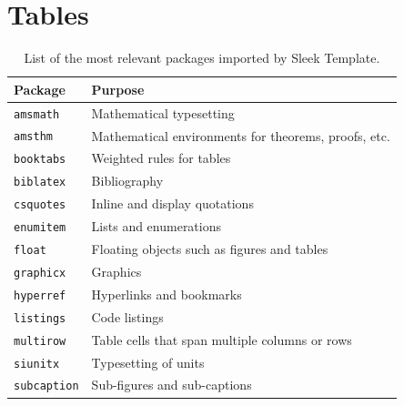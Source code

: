 \documentclass[a4paper, 12pt]{report}
\begin{document}
    \printbibliography

    \appendix

    \chapter{Tables} \label{chap:Tables}

    \begin{table}[h]
        \centering
        \begin{tabular}{ll}
            \toprule
            \textbf{Package} & \textbf{Purpose} \\
            \midrule
            \texttt{amsmath} & Mathematical typesetting \\
            \texttt{amsthm} & Mathematical environments for theorems, proofs, etc. \\
            \texttt{booktabs} & Weighted rules for tables \\
            \texttt{biblatex} & Bibliography \\
            \texttt{csquotes} & Inline and display quotations \\
            \texttt{enumitem} & Lists and enumerations \\
            \texttt{float} & Floating objects such as figures and tables \\
            \texttt{graphicx} & Graphics \\
            \texttt{hyperref} & Hyperlinks and bookmarks \\
            \texttt{listings} & Code listings \\
            \texttt{multirow} & Table cells that span multiple columns or rows \\
            \texttt{siunitx} & Typesetting of units  \\
            \texttt{subcaption} & Sub-figures and sub-captions \\
            \bottomrule
        \end{tabular}
        \caption{List of the most relevant packages imported by Sleek Template.}
        \label{tab:sleek_relevant_packages}
    \end{table}
\end{document}
